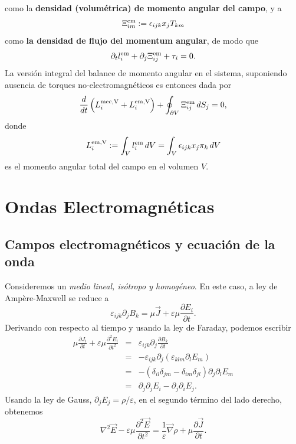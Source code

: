 como la \textbf{densidad (volumétrica) de momento angular del campo}, y a
\begin{equation}
\Xi_{im}^{\rm em}:=\epsilon _{ijk}x_{j}T_{km}
\end{equation}
como \textbf{la densidad de flujo del momentum angular}, de modo que
\begin{equation}
\partial _{t}l_{i}^{\rm em} + \partial _{j}\Xi_{ij}^{\rm em} + \tau_i =0.
\end{equation}
La versión integral del balance de momento angular en el sistema, suponiendo ausencia de torques no-electromagnéticos es entonces dada por
\begin{equation}
\frac{d}{dt}\left(L_i^{\rm mec,V}+L_i^{\rm em,V}\right) + \oint_{\partial V}\Xi_{ij}^{\rm em}\,dS_j = 0,
\end{equation}
donde 
\begin{equation}
L_i^{\rm em,V} := \int_V l_{i}^{\rm em}\,dV= \int_V \epsilon _{ijk}x_{j}\pi_{k}\,dV
\end{equation}
es el momento angular total del campo en el volumen $V$.


\section{Ondas Electromagnéticas}

\subsection{Campos electromagnéticos y ecuación de la onda}

Consideremos un \textit{medio lineal, isótropo y homogéneo}. En este caso, a ley de Amp\`ere-Maxwell se reduce a
\begin{equation}
\varepsilon_{ijk}\partial_jB_k=\mu\vec{J}+\varepsilon\mu\frac{\partial E_i}{\partial t}.
\end{equation}
Derivando con respecto al tiempo y usando la ley de Faraday, podemos escribir
\begin{eqnarray}
\mu \frac{\partial J_i}{\partial t}+\varepsilon\mu\frac{\partial^2E_i}{\partial t^2}
&=&\varepsilon_{ijk}\partial_j\frac {\partial B_k}{\partial t} \\
&=&-\varepsilon_{ijk}\partial_j\left(\varepsilon_{klm}\partial_lE_m \right)\\
&=&-\left( \delta_{il}\delta_{jm}-\delta_{im}\delta_{jl}\right)
\partial_j\partial_lE_m\\
&=&\partial_j\partial_jE_i-\partial_j\partial_iE_j.
\end{eqnarray}
Usando la ley de Gauss, $\partial_jE_j=\rho/\varepsilon$, en el segundo término del lado derecho, obtenemos
\begin{equation}\label{EcOihE}
\boxed{\nabla^2\vec{E}-\varepsilon\mu\frac{\partial^2\vec{E}}{\partial t^2}=\frac{1}{\varepsilon}\vec\nabla\rho+\mu\frac{\partial\vec{J}}{\partial t}.}
\end{equation}

